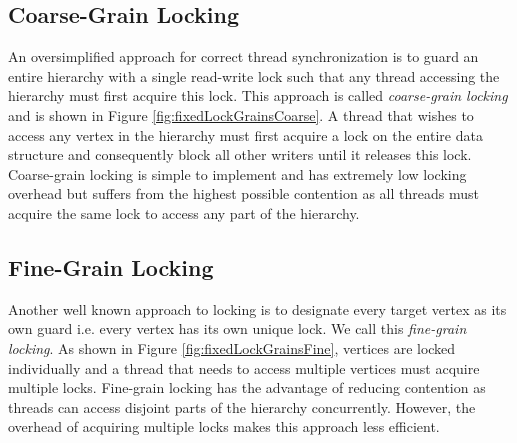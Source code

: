 \subsection{Coarse-Grain Locking}
An oversimplified approach for correct thread synchronization is to guard an entire hierarchy with a single read-write lock such that any thread accessing the hierarchy must first acquire this lock.
This approach is called \emph{coarse-grain locking} and is shown in Figure \ref{fig:fixedLockGrainsCoarse}.
A thread that wishes to access any vertex in the hierarchy must first acquire a lock on the entire data structure and consequently block all other writers until it releases this lock. 
Coarse-grain locking is simple to implement and has extremely low locking overhead but suffers from the highest possible contention as all threads must acquire the same lock to access any part of the hierarchy. 


\subsection{Fine-Grain Locking}
Another well known approach to locking is to designate every target vertex as its own guard i.e. every vertex has its own unique lock. 
We call this \emph{fine-grain locking}.
As shown in Figure \ref{fig:fixedLockGrainsFine}, vertices are locked individually and a thread that needs to access multiple vertices must acquire multiple locks. 
Fine-grain locking has the advantage of reducing contention as threads can access disjoint parts of the hierarchy concurrently. 
However, the overhead of acquiring multiple locks makes this approach less efficient. 









